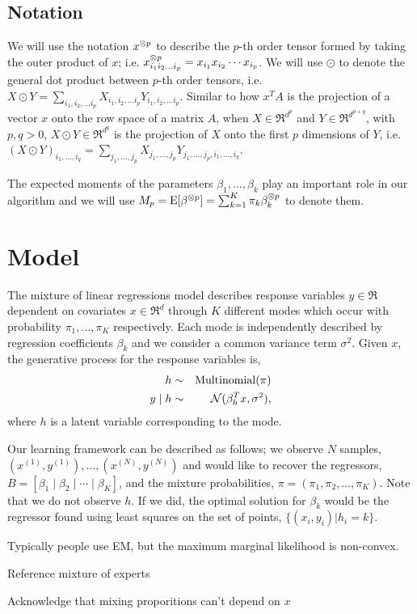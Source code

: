 \subsection{Notation}


We will use the notation $x^{\otimes p}$ to describe the $p$-th order tensor
formed by taking the outer product of $x$; i.e. $x^{\otimes p}_{i_1 i_2 \ldots
i_p} = x_{i_1} x_{i_2} \cdots x_{i_p}$. We will use $\odot$ to denote
the general dot product between $p$-th order tensors, i.e. $X \odot
Y = \sum_{i_1, i_2, \ldots i_p} X_{i_1, i_2, \ldots i_p} Y_{i_1, i_2,
\ldots i_p}.$ Similar to how $x^T A$ is the projection of a vector $x$
onto the row space of a matrix $A$, when $X \in \Re^{d^p}$ and $Y \in
\Re^{d^{p+q}}$,  with $p, q > 0$, $X \odot Y \in \Re^{d^q}$ is the
projection of $X$ onto the first $p$ dimensions of $Y$, i.e. $(X \odot
Y)_{i_1, \ldots, i_q} = \sum_{j_1, \ldots, j_p} X_{j_1, \ldots, j_p}
Y_{j_1, \ldots, j_p, i_1, \ldots, i_q}$.

The expected moments of the parameters $\beta_1, \dots, \beta_k$ play an
important role in our algorithm and we will use $M_p = \operatorname{E}[\beta^{\otimes p}]
= \sum_{k=1}^{K} \pi_k \beta_k^{\otimes p}$ to denote them.

\section{Model}
\label{sec:model}

\newcommand{\xn}[1]{x^{(#1)}}
\newcommand{\xni}{\xn{i}}
\newcommand{\yn}[1]{y^{(#1)}}
\newcommand{\yni}{\yn{i}}

The mixture of linear regressions model describes response variables $y
\in \Re$ dependent on covariates $x \in \Re^d$ through $K$ different
modes which occur with probability $\pi_1, \dots, \pi_K$ respectively.
Each mode is independently described by regression coefficients
$\beta_k$ and we consider a common variance term $\sigma^2$. Given $x$,
the generative process for the response variables is,
\begin{eqnarray*}
  h &\sim& \operatorname{Multinomial}(\pi) \\
  y \mid h &\sim& \mathcal{N}( \beta_{h}^T x,  \sigma^2 ),
\end{eqnarray*}
where $h$ is a latent variable corresponding to the mode.

Our learning framework can be described as follows; we observe $N$
samples, $(\xn{1}, \yn{1}), \dots, (\xn{N}, \yn{N})$ and would like to
recover the regressors, $B = [\beta_1 \mid \beta_2 \mid \cdots \mid
\beta_K]$, and the mixture probabilities, $\pi = (\pi_1, \pi_2, \dots,
\pi_K)$. Note that we do not observe $h$. If we did, the optimal
solution for $\beta_k$ would be the regressor found using least squares
on the set of points, $\{(x_i, y_i) | h_i = k \}$.

Typically people use EM, but the maximum marginal likelihood is non-convex.

Reference mixture of experts

Acknowledge that mixing proporitions can't depend on $x$
